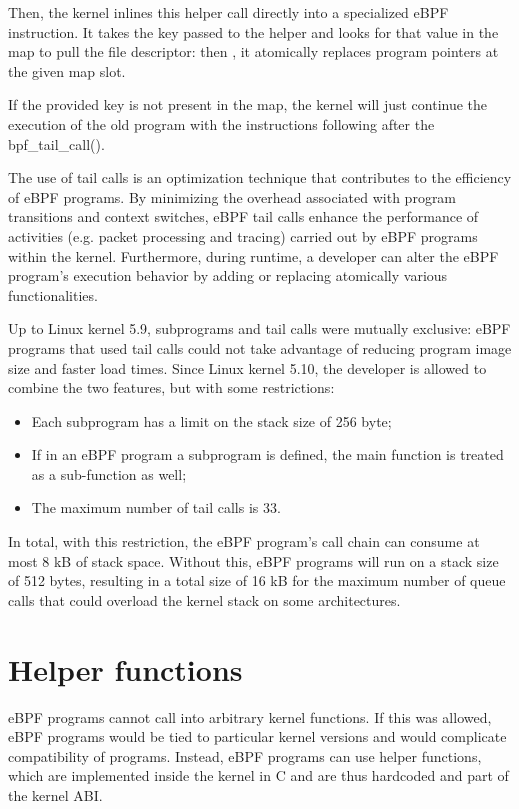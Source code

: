 Then, the kernel inlines this helper call directly into a specialized eBPF instruction.
It takes the key passed to the helper and looks for that value in the map to pull the file descriptor: then , it atomically replaces program pointers at the given map slot. 

If the provided key is not present in the map, the kernel will just continue the execution of the old program with the instructions following after the bpf\_tail\_call().

The use of tail calls is an optimization technique that contributes to the efficiency of eBPF programs. 
By minimizing the overhead associated with program transitions and context switches, eBPF tail calls enhance the performance of activities (e.g. packet processing and tracing) carried out by eBPF programs within the kernel.
Furthermore, during runtime, a developer can alter the eBPF program's execution behavior by adding or replacing atomically various functionalities.

Up to Linux kernel 5.9, subprograms and tail calls were mutually exclusive: eBPF programs that used tail calls could not take advantage of reducing program image size and faster load times.
Since Linux kernel 5.10, the developer is allowed to combine the two features, but with some restrictions:

\begin{itemize}
	\item Each subprogram has a limit on the stack size of 256 byte;
	\item If in an eBPF program a subprogram is defined, the main function is treated 
		as a sub-function as well;
	\item The maximum number of tail calls is 33.
\end{itemize}

In total, with this restriction, the eBPF program’s call chain can consume at most 8 kB of stack space. 
Without this, eBPF programs will run on a stack size of 512 bytes, resulting in a total size of 16 kB for the maximum number of queue calls that could overload the kernel stack on some architectures.

\section{Helper functions}

eBPF programs cannot call into arbitrary kernel functions. 
If this was allowed, eBPF programs would be tied to particular kernel versions and would complicate compatibility of programs. 
Instead, eBPF programs can use helper functions, which are implemented inside the kernel in C and are thus hardcoded and part of the kernel ABI. 

